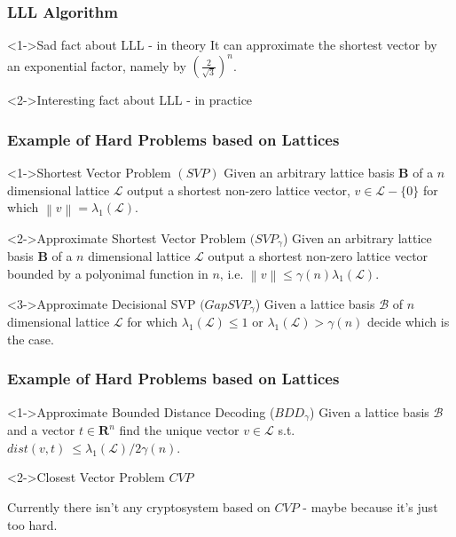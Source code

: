 \documentclass{beamer}
\newcommand{\norm}[1]{\left\lVert#1\right\rVert}
\begin{document}
\begin{frame}
    \frametitle{LLL Algorithm}
    \begin{block}<1->{Sad fact about LLL - in theory}
        It can approximate the shortest vector by an exponential factor, namely by $(\frac{2}{\sqrt{3}})^n$.
    \end{block}
    \begin{block}<2->{Interesting fact about LLL - in practice}
    \end{block}
\end{frame}

\begin{frame}
    \frametitle{Example of Hard Problems based on Lattices}
    \begin{block}<1->{Shortest Vector Problem $(SVP)$}
        Given an arbitrary lattice basis $\mathbf{B}$ of a $n$ dimensional lattice $\mathcal{L}$ output a shortest non-zero lattice vector, $v \in \mathcal{L} - \{0 \}$ for which $\norm{v} = \lambda_1(\mathcal{L})$.
    \end{block}

    \begin{block}<2->{Approximate Shortest Vector Problem $(SVP_{\gamma}$)}
        Given an arbitrary lattice basis $\mathbf{B}$ of a $n$ dimensional lattice $\mathcal{L}$ output a shortest non-zero lattice vector bounded by a polyonimal function in $n$, i.e. $\norm{v} \leq \gamma(n) \lambda_1(\mathcal{L})$.
    \end{block}

    \begin{block}<3->{Approximate Decisional SVP $(GapSVP_{\gamma}$)}
        Given a lattice basis $\mathcal{B}$ of $n$ dimensional lattice $\mathcal{L}$ for which $\lambda_1(\mathcal{L}) \leq 1$ or $\lambda_1(\mathcal{L}) > \gamma(n)$ decide which is the case.
    \end{block}
\end{frame}

\begin{frame}
    \frametitle{Example of Hard Problems based on Lattices}

    \begin{block}<1->{Approximate Bounded Distance Decoding ($BDD_{\gamma}$)}
        Given a lattice basis $\mathcal{B}$ and a vector $t \in \mathbf{R}^n$ find the unique vector $v \in \mathcal{L}$ s.t. $dist(v, t) \ \leq \lambda_1(\mathcal{L}) / 2 \gamma(n)$.
    \end{block}

    \begin{block}<2->{Closest Vector Problem $CVP$}   

    \pause Currently there isn't any cryptosystem based on $CVP$ - maybe because it's just too hard.
    \end{block} 
\end{frame}
\end{document}
